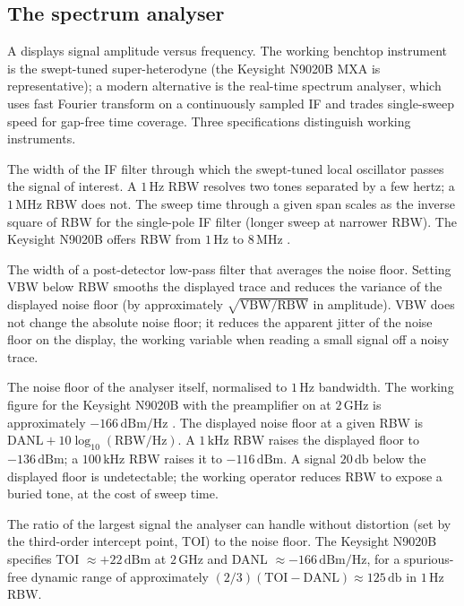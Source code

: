 \subsection{The spectrum analyser}

A  displays signal amplitude versus
frequency. The working benchtop instrument is the swept-tuned
super-heterodyne (the Keysight N9020B MXA is representative); a
modern alternative is the real-time spectrum analyser, which uses
fast Fourier transform on a continuously sampled IF and trades
single-sweep speed for gap-free time coverage. Three specifications
distinguish working instruments.

 The width of the IF filter
through which the swept-tuned local oscillator passes the signal of
interest. A $1 \,\si{\hertz}$ RBW resolves two tones separated by a
few hertz; a $1 \,\si{\mega\hertz}$ RBW does not. The sweep time
through a given span scales as the inverse square of RBW for the
single-pole IF filter (longer sweep at narrower RBW). The Keysight
N9020B offers RBW from $1 \,\si{\hertz}$ to $8 \,\si{\mega\hertz}$
\cite{text:ch05t3-keysight-n9020b-datasheet}.

 The width of a post-detector
low-pass filter that averages the noise floor. Setting VBW below
RBW smooths the displayed trace and reduces the variance of the
displayed noise floor (by approximately $\sqrt{\text{VBW}/\text{RBW}}$
in amplitude). VBW does not change the absolute noise floor; it
reduces the apparent jitter of the noise floor on the display, the
working variable when reading a small signal off a noisy trace.

 The noise floor of
the analyser itself, normalised to $1 \,\si{\hertz}$ bandwidth. The
working figure for the Keysight N9020B with the preamplifier on at
$2 \,\si{\giga\hertz}$ is approximately $-166 \,\text{dBm/Hz}$
\cite{text:ch05t3-keysight-n9020b-datasheet}. The displayed noise
floor at a given RBW is $\text{DANL} + 10 \log_{10}(\text{RBW}/\si
{\hertz})$. A $1 \,\si{\kilo\hertz}$ RBW raises the displayed floor
to $-136 \,\text{dBm}$; a $100 \,\si{\kilo\hertz}$ RBW raises it to
$-116 \,\text{dBm}$. A signal $20 \,\si{\decibel}$ below the
displayed floor is undetectable; the working operator reduces RBW
to expose a buried tone, at the cost of sweep time.

 The ratio of the largest signal the
analyser can handle without distortion (set by the third-order
intercept point, TOI) to the noise floor. The Keysight N9020B
specifies TOI $\approx +22 \,\text{dBm}$ at $2 \,\si{\giga\hertz}$
and DANL $\approx -166 \,\text{dBm/Hz}$, for a spurious-free dynamic
range of approximately $(2/3)(\text{TOI} - \text{DANL}) \approx 125
\,\si{\decibel}$ in $1 \,\si{\hertz}$ RBW.

